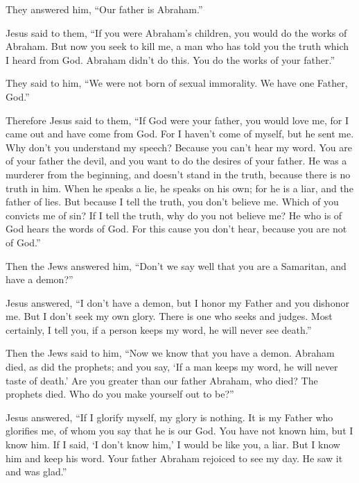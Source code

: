  They answered him, ``Our father is Abraham.''

Jesus said to them, ``If you were Abraham's children, you would do the
works of Abraham.  But now you seek to kill me, a man who
has told you the truth which I heard from God. Abraham didn't do this.
 You do the works of your father.''

They said to him, ``We were not born of sexual immorality. We have one
Father, God.''

 Therefore Jesus said to them, ``If God were your father,
you would love me, for I came out and have come from God. For I haven't
come of myself, but he sent me.  Why don't you understand
my speech? Because you can't hear my word.  You are of
your father the devil, and you want to do the desires of your father. He
was a murderer from the beginning, and doesn't stand in the truth,
because there is no truth in him. When he speaks a lie, he speaks on his
own; for he is a liar, and the father of lies.  But
because I tell the truth, you don't believe me.  Which of
you convicts me of sin? If I tell the truth, why do you not believe me?
 He who is of God hears the words of God. For this cause
you don't hear, because you are not of God.''

 Then the Jews answered him, ``Don't we say well that you
are a Samaritan, and have a demon?''

 Jesus answered, ``I don't have a demon, but I honor my
Father and you dishonor me.  But I don't seek my own
glory. There is one who seeks and judges.  Most
certainly, I tell you, if a person keeps my word, he will never see
death.''

 Then the Jews said to him, ``Now we know that you have a
demon. Abraham died, as did the prophets; and you say, `If a man keeps
my word, he will never taste of death.'  Are you greater
than our father Abraham, who died? The prophets died. Who do you make
yourself out to be?''

 Jesus answered, ``If I glorify myself, my glory is
nothing. It is my Father who glorifies me, of whom you say that he is
our God.  You have not known him, but I know him. If I
said, `I don't know him,' I would be like you, a liar. But I know him
and keep his word.  Your father Abraham rejoiced to see
my day. He saw it and was glad.''


